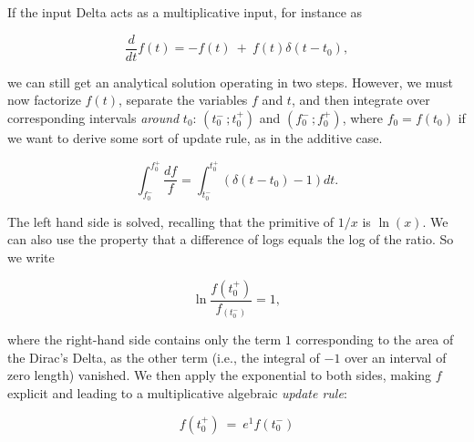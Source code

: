 \begin{svgraybox}
	\\
	\\
	If the input Delta acts as a multiplicative input, for instance as  

	\begin{equation}
		\frac{d}{dt}f(t) = - f(t)\ +\ f(t) \delta(t - t_0),
	\end{equation}

	we can still get an analytical solution operating in two steps. However, we must now factorize \(f(t)\), separate the variables \(f\) and \(t\), and then integrate over corresponding intervals \textit{around} \(t_0\):  \( (t_0^ -\,  ; t_0^+ ) \) and \( (f_0^ -\,  ; f_0^+ ) \), where \(f_0 = f(t_0)\) if we want to derive some sort of update rule, as in the additive case. 
	
	\begin{equation}
		\int_{f_0^-}^{f_0^+} \frac{df}{f} = \int_{t_0^ -}^{t_0^+} (\delta(t - t_0) - 1)dt.
	\end{equation}

	The left hand side is solved, recalling that the primitive of \(1/x\) is \(\ln(x)\). We can also use the property that a difference of logs equals the log of the ratio. So we write 

	\begin{equation}
		\ln \frac{f(t_0^+)}{f_(t_0^-)} = 1,
	\end{equation}

	where the right-hand side contains only the term \(1 \) corresponding to the area of the Dirac's Delta, as the other term (i.e., the integral of \( -1\) over an interval of zero length) vanished. We then apply the exponential to both sides, making \(f\) explicit and leading to a multiplicative algebraic \textit{update rule}:
	
	\begin{equation}
		f(t_0^+)\ =\ e^{1} f(t_0^-)
	\end{equation}

\end{svgraybox}

